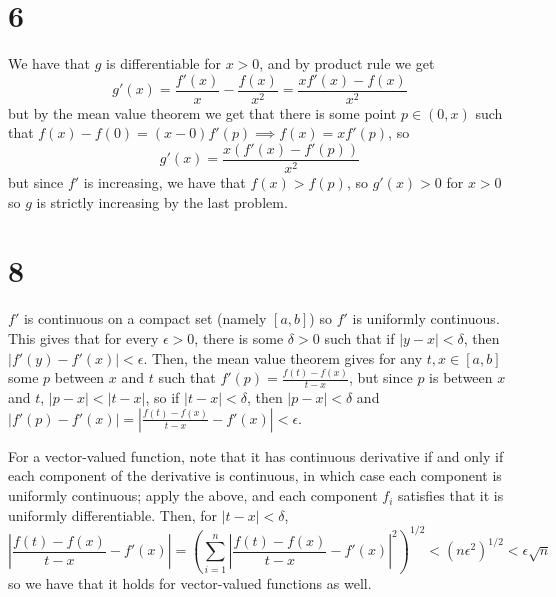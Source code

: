 \documentclass[12pt,letterpaper]{article}
\theoremstyle{definition}
\begin{document}
\section*{6}

We have that $g$ is differentiable for $x > 0$, and by product rule we get
\[
  g'(x) = \frac{f'(x)}{x} - \frac{f(x)}{x^{2}} = \frac{xf'(x) - f(x)}{x^{2}}
\]
but by the mean value theorem we get that there is some point $p \in (0, x)$ such that $f(x) - f(0) = (x - 0)f'(p) \implies f(x) = xf'(p)$, so
\[
  g'(x) = \frac{x(f'(x) - f'(p))}{x^{2}}
\]
but since $f'$ is increasing, we have that $f(x) > f(p)$, so $g'(x) > 0$ for $x > 0$ so $g$ is strictly increasing by the last problem.

\section*{8}

$f'$ is continuous on a compact set (namely $[a,b]$) so $f'$ is uniformly continuous. This gives that for every $\epsilon > 0$, there is some $\delta > 0$ such that if $|y - x| < \delta$, then $|f'(y) - f'(x)| < \epsilon$. Then, the mean value theorem gives for any $t, x \in [a,b]$ some $p$ between $x$ and $t$ such that $f'(p) = \frac{f(t) - f(x)}{t - x}$, but since $p$ is between $x$ and $t$, $|p - x| < |t-x|$, so if $|t - x| < \delta$, then $|p  - x| < \delta$ and $|f'(p) - f'(x)|  = \left|\frac{f(t)-f(x)}{t-x} - f'(x)\right|< \epsilon$.

For a vector-valued function, note that it has continuous derivative if and only if each component of the derivative is continuous, in which case each component is uniformly continuous; apply the above, and each component $f_{i}$ satisfies that it is uniformly differentiable. Then, for $|t - x| <\delta$,
\[
  \left|\frac{f(t) - f(x)}{t - x} - f'(x)\right| = \left(\sum_{i=1}^{n}\left|\frac{f(t) - f(x)}{t - x} - f'(x)\right|^{2}\right)^{1/2} < (n\epsilon^{2})^{1/2} < \epsilon\sqrt{n}
\]
so we have that it holds for vector-valued functions as well.
\end{document}
